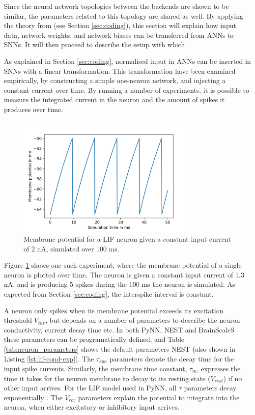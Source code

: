 Since the neural network topologies between the backends are shown to be similar,
the parameters related to this topology are shared as well.
By applying the theory from \textcite{Rueckauer2017} (see Section
\ref{sec:coding}), this section will explain how input data, network weights,
and network biases can be transferred from \glspl{ANN} to \glspl{SNN}.
It will then proceed to describe the setup with which 


As explained in Section \ref{sec:coding}, normalised input in \glspl{ANN} can
be inserted in \glspl{SNN} with a linear transformation.
This transformation have been examined empirically, by constructing a simple 
one-neuron network, and injecting a constant current over time.
By running a number of experiments, it is possible to measure the integrated
current in the neuron and the amount of spikes it produces over time.

\begin{figure}
  \centering
  \includegraphics[width=0.8\textwidth]{images/membrane.png}
  \caption{Membrane potential for a LIF neuron given a constant input current of
  2 nA, simulated over 100 ms.}
  \label{fig:membrane}
\end{figure}

Figure \ref{fig:membrane} shows one such experiment, where the membrane
potential of a single neuron is plotted over time.
The neuron is given a constant input current of 1.3 nA, and is 
producing 5 spikes during the 100 ms the neuron is simulated. 
As expected from Section \ref{sec:coding}, the interspike interval is constant.

A neuron only spikes when its membrane potential exceeds its excitation threshold
$V_{thr}$, but depends on a number of parameters to describe the neuron
conductivity, current decay time etc.
In both PyNN, NEST and BrainScaleS these parameters can be programatically
defined, and Table \ref{tab:neuron_parameters} shows the default parameters
NEST (also shown in Listing \ref{lst:lif-cond-exp}).
The $\tau_{syn}$ parameters denote the decay time for the input spike currents. 
Similarly, the membrane time constant, $\tau_m$, expresses the time it takes for the
neuron membrane to decay to its resting state ($V_{rest}$) if no other
input arrives. 
For the LIF model used in PyNN,
all $\tau$ parameters decay exponentially \cite{Davison2009}.
The $V_{rev}$ parameters explain the potential to integrate into the neuron,
when either excitatory or inhibitory input arrives. 

